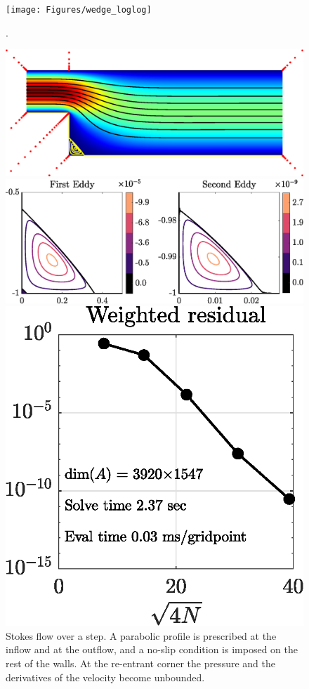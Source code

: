 \begin{figure}[H]
	\centering
	\texttt{[image: Figures/wedge\_loglog]}
	\caption{.}
	\label{fig:wedge_loglog}
\end{figure}

\begin{figure}[H]
	\centering
	\includegraphics[width=\linewidth]{Figures/step}
	
	\vspace{2em}
	\includegraphics[width=\linewidth]{Figures/step_eddy}
	
	\vspace{2em}
	\includegraphics[width=0.5\linewidth]{Figures/step_conv}

	\caption{Stokes flow over a step. A parabolic profile is prescribed at the inflow and at the outflow, and a no-slip condition is imposed on the rest of the walls. At the re-entrant corner the pressure and the derivatives of the velocity become unbounded.}
	\label{fig:step}
\end{figure} 

